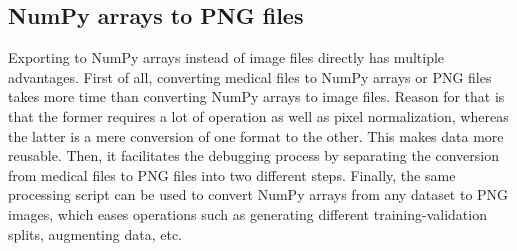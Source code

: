 \subsection{NumPy arrays to PNG files}
Exporting to NumPy arrays instead of image files directly has multiple advantages. First of all, converting medical files to NumPy arrays or PNG files takes more time than converting NumPy arrays to image files. Reason for that is that the former requires a lot of operation as well as pixel normalization, whereas the latter is a mere conversion of one format to the other. This makes data more reusable. Then, it facilitates the debugging process by separating the conversion from medical files to PNG files into two different steps. Finally, the same processing script can be used to convert NumPy arrays from any dataset to PNG images, which eases operations such as generating different training-validation splits, augmenting data, etc.

